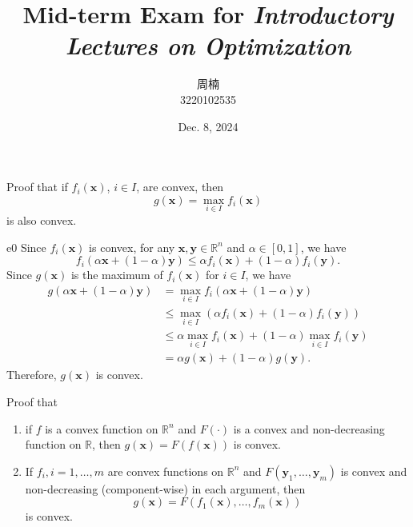 \documentclass{article}
\title{Mid-term Exam for \emph{Introductory Lectures on Optimization}}
\author{周楠 \\ 3220102535}
\date{Dec. 8, 2024}
\newcommand{\xB}{\bm{x}}
\newcommand{\yB}{\bm{y}}
\newcommand{\RBB}{\mathbb{R}}
\begin{document}
\maketitle

\begin{excercise}\label{e0}
Proof that if $f_i(\xB)$, $i \in I$, are convex, then
\[
g(\xB) = \max_{i \in I} f_i(\xB)
\]
is also convex.
\end{excercise}
\begin{PROOF}{e0}
Since $f_i(\xB)$ is convex, for any $\xB, \yB \in \RBB^n$ and $\alpha \in [0, 1]$, we have
\[
f_i(\alpha \xB + (1 - \alpha) \yB) \leq \alpha f_i(\xB) + (1 - \alpha) f_i(\yB).
\]
Since $g(\xB)$ is the maximum of $f_i(\xB)$ for $i \in I$, we have
\[
\begin{aligned}
g(\alpha \xB + (1 - \alpha) \yB) &= \max_{i \in I} f_i(\alpha \xB + (1 - \alpha) \yB) \\
&\leq \max_{i \in I} (\alpha f_i(\xB) + (1 - \alpha) f_i(\yB)) \\
&\leq \alpha \max_{i \in I} f_i(\xB) + (1 - \alpha) \max_{i \in I} f_i(\yB) \\
&= \alpha g(\xB) + (1 - \alpha) g(\yB).
\end{aligned}
\]
Therefore, $g(\xB)$ is convex.
\end{PROOF}
\newpage
\begin{excercise}\label{e1}
Proof that 
\begin{enumerate}
%
\item  if $f$ is a convex function on $\RBB^n$ and  $F(\cdot)$ is a convex and non-decreasing function on $\RBB$, then $g(\xB) = F(f(\xB))$ is convex.
%
\item If $f_i, i=1,\ldots, m$ are convex functions on $\RBB^n$ and  $F(\yB_1, \ldots, \yB_m)$ is convex and non-decreasing (component-wise) in each argument, then 
\[
g(\xB) = F(f_1(\xB), \ldots, f_m(\xB))
\]
is convex.
\end{enumerate}
\end{excercise}
\end{document}
